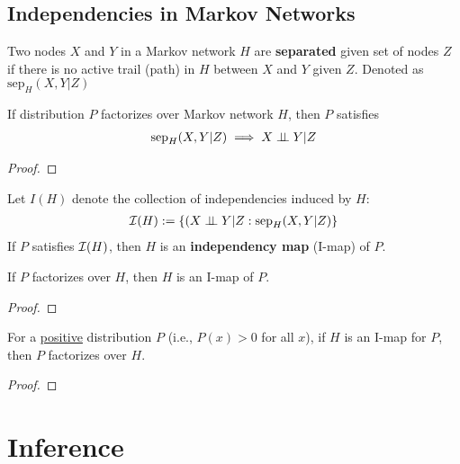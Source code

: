 \documentclass[11pt]{article}
\newcommand{\sep}[0]{\text{sep}}
\begin{document}
	\subsection{Independencies in Markov Networks}
	\begin{definition}
		Two nodes $X$ and $Y$ in a Markov network $H$ are \textbf{separated} given set of nodes $Z$ if there is no active trail (path) in $H$ between $X$ and $Y$ given $Z$. Denoted as $\sep_H(X, Y|Z)$
	\end{definition}
	
	\begin{theorem}
		If distribution $P$ factorizes over Markov network $H$, then $P$ satisfies
		\begin{align}
			\sep_H(X, Y|Z) \implies X \indep Y | Z
		\end{align} 
	\end{theorem}
	
	\begin{proof}
		
	\end{proof}
	
	\begin{definition}
		Let $I(H)$ denote the collection of independencies induced by $H$:
		\begin{align}
			\mc{I}(H) := \{(X \indep Y | Z: \sep_H(X, Y | Z)\}
		\end{align}
		If $P$ satisfies $\mathcal{{I}}(H)$, then $H$ is an \textbf{independency map} (I-map) of $P$.
	\end{definition}
	
	\begin{theorem}
		If $P$ factorizes over $H$, then $H$ is an I-map of $P$.
	\end{theorem}
	
	\begin{proof}
		
	\end{proof}
	
	\begin{theorem}
		For a \ul{positive} distribution $P$ (i.e., $P(x) >0$ for all $x$), if $H$ is an I-map for $P$, then $P$ factorizes over $H$.
	\end{theorem}
	
	\begin{proof}
		
	\end{proof}


	\section{Inference}
\end{document}
